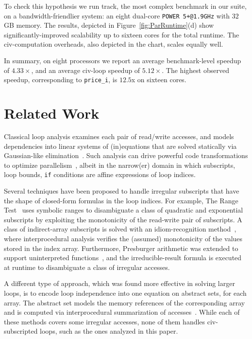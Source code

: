 \documentclass{sig-alternate}
\begin{document}
To check this hypothesis we run {\sc track}, the most complex benchmark in our suite, 
on a bandwidth-friendlier system: an eight dual-core {\tt POWER 5+@1.9GHz} with $32$GB memory. 
The results, depicted in Figure~\ref{fig:ParRuntime}(d) show 
significantly-improved scalability up to sixteen cores for the 
total runtime. 
The {\sc civ}-computation overheads, also depicted in the chart, scales equally well.  
 
In summary, on eight processors we report an average benchmark-level
speedup of $4.33\times$, and an average {\sc civ}-loop speedup of $5.12\times$. 
The highest observed speedup, corresponding to {\tt price\_i}, is $12.5$x 
on sixteen cores.


\section{Related Work} 
\label{sec:RelWork}

Classical loop analysis examines each pair of read/write accesses, %
and models dependencies into linear systems of (in)equations that are solved
statically  via Gaussian-like elimination~\cite{BanerjeeIneqTest,FeautrierDataflow}. %
Such analysis  can drive powerful code transformations to optimize 
parallelism~\cite{PolyhedralOpt}, albeit in the narrow(er) domain 
in which subscripts, loop bounds, {\tt if} conditions are affine 
expressions of loop indices.

Several techniques have been proposed to handle irregular subscripts that have
the shape of closed-form formulas in the loop indices. For example, 
The Range Test~\cite{Blume94RangeTest} uses symbolic 
ranges to disambiguate a class of quadratic and  
exponential subscripts by exploiting the monotonicity of the read-write pair 
of subscripts.   A class of indirect-array subscripts is solved with 
an idiom-recognition method~\cite{PaduaDemDrInterproc}, where interprocedural 
analysis verifies the (assumed) monotonicity of the values stored in the 
index array.
%
Furthermore, Presburger arithmetic was extended to support
uninterpreted functions~\cite{Pugh98NonlinPresb}, and the irreducible-result
formula is executed at runtime to disambiguate a class of irregular
accesses. 

A different type of approach, which was found more effective in
solving larger loops, is to encode loop independence into one equation 
on abstract sets, for each array. The abstract set models the
memory references of the corresponding array and is computed 
via interprocedural summarization of 
accesses~\cite{SUIF,Moon99PredArrDataFlow,SummaryMonot,LMAD}.
While each of these methods covers some irregular accesses,
none of them handles {\sc civ}-subscripted loops,   
such as the ones analyzed in this paper.
%
\end{document}
